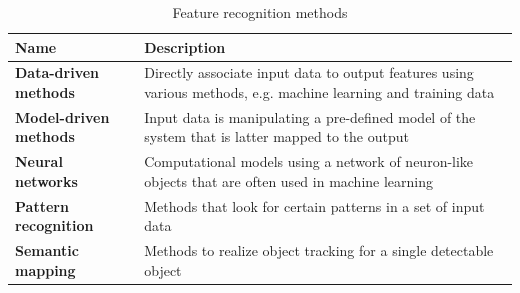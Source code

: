 \begin{table}[htbp]
  \centering
  \caption{Feature recognition methods}
    \begin{tabular}{lp{7cm}}
    \toprule
    \textbf{Name} & \textbf{Description} \\
    \midrule
    \textbf{Data-driven  methods} & Directly associate input data to output features using various methods, e.g. machine learning and training data \\ \addlinespace
    \textbf{Model-driven methods} & Input data is manipulating a pre-defined model of the system that is latter mapped to the output \\ \addlinespace
    \textbf{Neural networks} & Computational models using a network of neuron-like objects that are often used in machine learning \\ \addlinespace
    \textbf{Pattern recognition} & Methods that look for certain patterns in a set of input data \\ \addlinespace
    \textbf{Semantic mapping} & Methods to realize object tracking for a single detectable object \\
    \bottomrule
    \end{tabular}%
  \label{tab:rel_feature}%
\end{table}%


